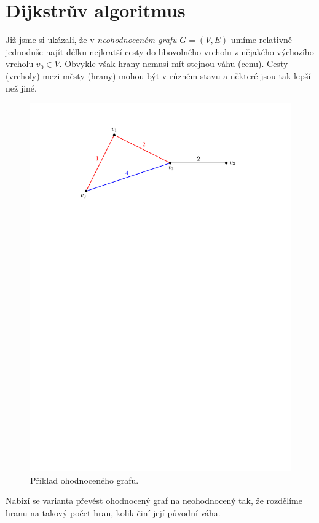 \section{Dijkstrův algoritmus}\label{sec:dijkstra}

Již jsme si ukázali, že v \emph{neohodnoceném grafu} $G=(V,E)$ umíme relativně jednoduše najít délku nejkratší cesty do libovolného vrcholu z nějakého výchozího vrcholu $v_0\in V$. Obvykle však hrany nemusí mít stejnou váhu (cenu). Cesty (vrcholy) mezi městy (hrany) mohou být v různém stavu a některé jsou tak lepší než jiné.
\begin{figure}[h]
    \centering
    \includegraphics[scale=\graphimgsize]{components/images/ch01_ohod_graf.pdf}
    \caption{Příklad ohodnoceného grafu.}
    \label{fig:ohod_graf}
\end{figure}
Nabízí se varianta převést ohodnocený graf na neohodnocený tak, že rozdělíme hranu na takový počet hran, kolik činí její původní váha.